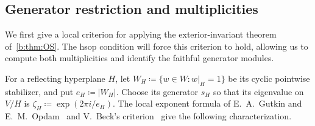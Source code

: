 \documentclass[11pt]{amsart}
\newcommand{\defeq}{\coloneqq}
\theoremstyle{definition}
\begin{document}
\subsection{Generator restriction and multiplicities}\label{sec:reflection-restrictions}

We first give a local criterion for applying the exterior-invariant
theorem of~\cref{b:thm:OS}. The hsop condition will force this criterion to
hold, allowing us to compute both multiplicities and identify the
faithful generator modules.

For a reflecting hyperplane $H$, let
$W_H\defeq\{w\in W:w|_H=1\}$ be its cyclic pointwise stabilizer,
and put $e_H\defeq|W_H|$. Choose its generator $s_H$ so
that its eigenvalue on $V/H$ is $\zeta_H\defeq\exp(2\pi i/e_H)$.
The local exponent formula of E.~A.~Gutkin and E.~M.~Opdam~\cite[Lemma 2.1]{Opdam}
and V.~Beck's criterion~\cite[Definition 4(ii) and Remark 1(i)]{Beck}
give the following characterization.
\end{document}
